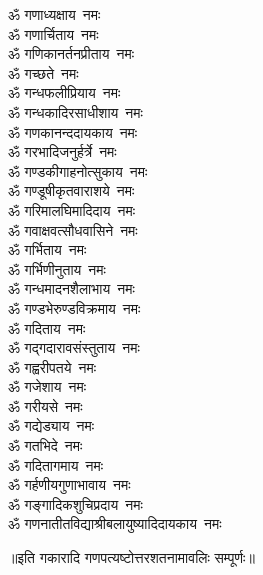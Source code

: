 \begin{flushleft}
\begin{multicols}{2}
ॐ गणाध्यक्षाय~नमः\\
ॐ गणार्चिताय~नमः\\
ॐ गणिकानर्तनप्रीताय~नमः\\
ॐ गच्छते~नमः\\
ॐ गन्धफलीप्रियाय~नमः\\
ॐ गन्धकादिरसाधीशाय~नमः\\
ॐ गणकानन्ददायकाय~नमः\\
ॐ गरभादिजनुर्हर्त्रे~नमः\\
ॐ गण्डकीगाहनोत्सुकाय~नमः\hfill{}\\
ॐ गण्डूषीकृतवाराशये~नमः\\
ॐ गरिमालघिमादिदाय~नमः\\
ॐ गवाक्षवत्सौधवासिने~नमः\\
ॐ गर्भिताय~नमः\\
ॐ गर्भिणीनुताय~नमः\\
ॐ गन्धमादनशैलाभाय~नमः\\
ॐ गण्डभेरुण्डविक्रमाय~नमः\\
ॐ गदिताय~नमः\\
ॐ गद्गदारावसंस्तुताय~नमः\\
ॐ गह्वरीपतये~नमः\hfill{}\\
ॐ गजेशाय~नमः\\
ॐ गरीयसे~नमः\\
ॐ गद्येड्याय~नमः\\
ॐ गतभिदे~नमः\\
ॐ गदितागमाय~नमः\\
ॐ गर्हणीयगुणाभावाय~नमः\\
ॐ गङ्गादिकशुचिप्रदाय~नमः\\
ॐ गणनातीतविद्याश्री\-बलायुष्यादिदायकाय~नमः\\
\end{multicols}
\end{flushleft}
\centerline{॥इति गकारादि गणपत्यष्टोत्तरशतनामावलिः सम्पूर्णः॥}

